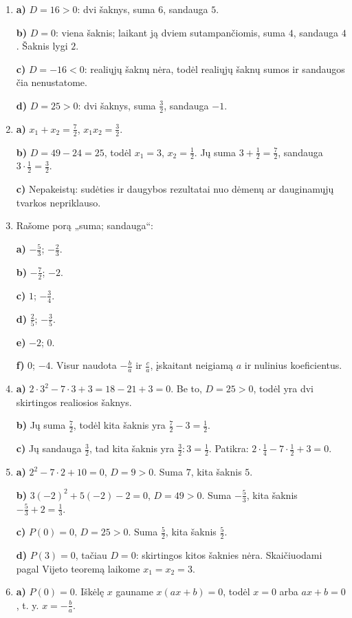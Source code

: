 \documentclass[12pt,a4paper]{article}
\begin{document}
\begin{enumerate}
\textbf{d)} Kai $a=1$, formulės tampa $x_1+x_2=-b$, $x_1x_2=c$. Jos taip pat patvirtina bendresnį 2 uždavinio spėjimą.
\item \textbf{a)} $D=16>0$: dvi šaknys, suma $6$, sandauga $5$.

\textbf{b)} $D=0$: viena šaknis; laikant ją dviem sutampančiomis, suma $4$, sandauga $4$. Šaknis lygi $2$.

\textbf{c)} $D=-16<0$: realiųjų šaknų nėra, todėl realiųjų šaknų sumos ir sandaugos čia nenustatome.

\textbf{d)} $D=25>0$: dvi šaknys, suma $\frac{3}{2}$, sandauga $-1$.
\item \textbf{a)} $x_1+x_2=\frac{7}{2}$, $x_1x_2=\frac{3}{2}$.

\textbf{b)} $D=49-24=25$, todėl $x_1=3$, $x_2=\frac{1}{2}$. Jų suma $3+\frac{1}{2}=\frac{7}{2}$, sandauga $3\cdot\frac{1}{2}=\frac{3}{2}$.

\textbf{c)} Nepakeistų: sudėties ir daugybos rezultatai nuo dėmenų ar dauginamųjų tvarkos nepriklauso.
\item Rašome porą „suma; sandauga“:

\textbf{a)} $-\frac{5}{3}$; $-\frac{2}{3}$.

\textbf{b)} $-\frac{7}{2}$; $-2$.

\textbf{c)} $1$; $-\frac{3}{4}$.

\textbf{d)} $\frac{2}{5}$; $-\frac{3}{5}$.

\textbf{e)} $-2$; $0$.

\textbf{f)} $0$; $-4$. Visur naudota $-\frac{b}{a}$ ir $\frac{c}{a}$, įskaitant neigiamą $a$ ir nulinius koeficientus.
\item \textbf{a)} $2\cdot3^2-7\cdot3+3=18-21+3=0$. Be to, $D=25>0$, todėl yra dvi skirtingos realiosios šaknys.

\textbf{b)} Jų suma $\frac{7}{2}$, todėl kita šaknis yra $\frac{7}{2}-3=\frac{1}{2}$.

\textbf{c)} Jų sandauga $\frac{3}{2}$, tad kita šaknis yra $\frac{3}{2}:3=\frac{1}{2}$. Patikra: $2\cdot\frac{1}{4}-7\cdot\frac{1}{2}+3=0$.
\item \textbf{a)} $2^2-7\cdot2+10=0$, $D=9>0$. Suma $7$, kita šaknis $5$.

\textbf{b)} $3(-2)^2+5(-2)-2=0$, $D=49>0$. Suma $-\frac{5}{3}$, kita šaknis $-\frac{5}{3}+2=\frac{1}{3}$.

\textbf{c)} $P(0)=0$, $D=25>0$. Suma $\frac{5}{2}$, kita šaknis $\frac{5}{2}$.

\textbf{d)} $P(3)=0$, tačiau $D=0$: skirtingos kitos šaknies nėra. Skaičiuodami pagal Vijeto teoremą laikome $x_1=x_2=3$.
\item \textbf{a)} $P(0)=0$. Iškėlę $x$ gauname $x(ax+b)=0$, todėl $x=0$ arba $ax+b=0$, t. y. $x=-\frac{b}{a}$.


\end{enumerate}
\end{document}
